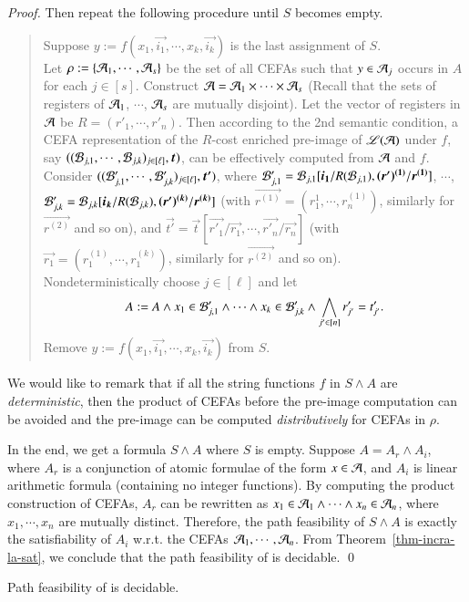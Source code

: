 \begin{proof}
Then repeat the following procedure until $S$ becomes empty.
%
\begin{quote}
Suppose $y := f(x_1, \vec{i_1}, \cdots, x_k, \vec{i_k})$ is the last assignment of $S$. 
\\
Let $\rho := \{\mathcal{A}_1, \cdots, \mathcal{A}_s\}$ be the set of all CEFAs such that $y \in \mathcal{A}_j$ occurs in $A$ for each $j \in [s]$. Construct $\mathcal{A} = \mathcal{A}_1 \times \cdots \times \mathcal{A}_s$ (Recall that the sets of registers of $\mathcal{A}_1$, $\cdots$, $\mathcal{A}_s$ are mutually disjoint). Let  the vector of registers in $\mathcal{A}$ be $R = (r'_1, \cdots, r'_n)$. Then according to the 2nd semantic condition, 
a CEFA representation of the $R$-cost enriched pre-image of $\mathscr{L}(\mathcal{A})$ under $f$, say $((\cB_{j, 1}, \cdots, \cB_{j, k})_{j \in [\ell]}, \vec{t})$, can be effectively computed from $\mathcal{A}$ and $f$. Consider $((\cB'_{j, 1}, \cdots, \cB'_{j, k})_{j \in [\ell]}, \vec{t'})$, where $\cB'_{j, 1} = \cB_{j, 1}[\vec{i_1}/R(\cB_{j,1}), \vec{(r')^{(1)}}/\vec{r^{(1)}}]$, $\cdots$, $\cB'_{j,k}=\cB_{j,k}[\vec{i_k}/R(\cB_{j,k}), \vec{(r')^{(k)}}/\vec{r^{(k)}}]$ (with $\vec{r^{(1)}}= (r^{1}_1, \cdots, r^{(1)}_n)$, similarly for $\vec{r^{(2)}}$ and so on), and $\vec{t'} = \vec{t}[\vec{r'_1}/\vec{r_1}, \cdots, \vec{r'_n}/\vec{r_n}]$ (with $\vec{r_1} = (r^{(1)}_1, \cdots, r^{(k)}_1)$, similarly for $\vec{r^{(2)}}$ and so on). 
\\
Nondeterministically choose $j \in [\ell]$ and let 
$$A:= A \wedge x_1 \in \mathcal{B}'_{j, 1} \wedge \cdots \wedge x_k \in \mathcal{B}'_{j, k}  \wedge \bigwedge \limits_{j' \in [n]} r'_{j'} = t'_{j'}.$$
%
Remove $y := f(x_1, \vec{i_1}, \cdots, x_k, \vec{i_k})$ from $S$.
\end{quote}

We would like to remark that if all the string functions $f$ in $S \wedge A$ are \emph{deterministic}, then the product of CEFAs before the pre-image computation can be avoided and the pre-image can be computed \emph{distributively} for CEFAs in $\rho$.

In the end, we get a formula $S \wedge A$ where $S$ is empty. Suppose $A = A_r \wedge A_i$, where $A_r$ is a conjunction of atomic formulae of the form $x \in \mathcal{A}$, and $A_i$ is linear arithmetic formula (containing no integer functions). By computing the product construction of CEFAs, $A_r$ can be rewritten as $x_1 \in \mathcal{A}_1 \wedge \cdots \wedge x_n \in \mathcal{A}_n$, where $x_1,\cdots, x_n$ are mutually distinct. Therefore, the path feasibility of $S \wedge A$ is exactly the satisfiability of $A_i$ w.r.t. the CEFAs $\mathcal{A}_1, \cdots, \mathcal{A}_n$. From Theorem~\ref{thm-incra-la-sat}, we conclude that the path feasibility of  {\slint} is decidable.
\qed
\end{proof}

\begin{corollary}
Path feasibility of {\cslint} is decidable.
\end{corollary}